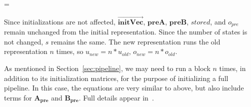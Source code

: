  = %
\doneeqnstar

Since initializations are not affected,
$\overrightarrow{\mathbf{initVec}}$, $\mathbf{preA}$, $\mathbf{preB}$,
$stored$, and $o_{pre}$ remain unchanged from the initial
representation. Since the number of states is not changed, $s$ remains
the same. The new representation runs the old representation $n$
times, so $u_{new} = n * u_{old}$, $o_{new} = n * o_{old}$.

As mentioned in Section~\ref{sec:pipeline}, we may need to run a block
$n$ times, in addition to its initialization matrices, for the purpose
of initializing a full pipeline.  In this case, the equations are very
similar to above, but also include terms for $\mathbf{A_{pre}}$ and
$\mathbf{B_{pre}}$.  Full details appear in~\cite{Agrawal04}.

